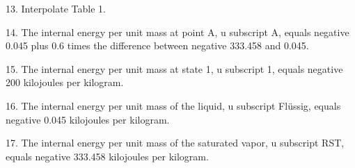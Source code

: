 13. Interpolate Table 1.

14. The internal energy per unit mass at point A, u subscript A, equals negative 0.045 plus 0.6 times the difference between negative 333.458 and 0.045.

15. The internal energy per unit mass at state 1, u subscript 1, equals negative 200 kilojoules per kilogram.

16. The internal energy per unit mass of the liquid, u subscript Flüssig, equals negative 0.045 kilojoules per kilogram.

17. The internal energy per unit mass of the saturated vapor, u subscript RST, equals negative 333.458 kilojoules per kilogram.